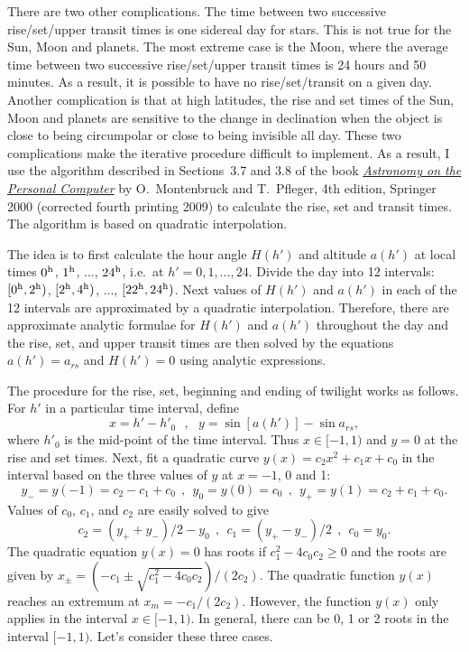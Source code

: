 \documentclass[12pt]{article}
\newcommand \beq {\begin{equation}}
\newcommand \eeq {\end{equation}}
\begin{document}
There are two other complications. The time between two successive 
rise/set/upper transit times is one sidereal day for stars. This is not true 
for the Sun, Moon and planets. The most extreme case is the Moon, where the 
average time between two successive rise/set/upper transit times is 24 hours 
and 50 minutes. As a result, it is possible to have no rise/set/transit on 
a given day. Another complication is that at high latitudes, the rise and set 
times of the Sun, Moon and planets are sensitive to the change in declination 
when the object is close to being circumpolar or close to being invisible all day. 
These two complications make the iterative procedure difficult to implement. As 
a result, I use the algorithm described in Sections~3.7 and 3.8 of the book 
\href{https://www.springer.com/us/book/9783540672210#}{\it Astronomy on the 
Personal Computer} by O.~Montenbruck and T.~Pfleger, 4th edition, Springer 2000 
(corrected fourth printing 2009) to calculate the rise, set and transit times. 
The algorithm is based on quadratic interpolation. 

The idea is to first calculate the hour angle $H(h')$ and altitude $a(h')$ at local times 
$0^{\rm h}$, $1^{\rm h}$, ..., $24^{\rm h}$, i.e.\ at 
$h'=0, 1, ..., 24$. Divide the day into 12 intervals: 
$[0^{\rm h}, 2^{\rm h})$, $[2^{\rm h}, 4^{\rm h})$, ..., $[22^{\rm h}, 24^{\rm h})$. 
Next values of $H(h')$ and $a(h')$ in each of the 12 intervals are approximated by 
a quadratic interpolation. Therefore, there are approximate analytic formulae for $H(h')$ and 
$a(h')$ throughout the day and the rise, set, 
and upper transit times are then solved by the equations $a(h')=a_{rs}$ and $H(h')=0$ 
using analytic expressions. 

The procedure for the rise, set, beginning and ending of twilight works as follows. 
For $h'$ in a particular time interval, define 
\beq
  x = h'-h'_0 \ \ \ , \ \ \ y = \sin [a(h')] - \sin a_{rs} ,
\eeq
where $h'_0$ is the mid-point of the time interval. Thus $x\in [-1,1)$ 
and $y=0$ at the rise and set times. 
Next, fit a quadratic curve $y(x)=c_2 x^2+c_1x+c_0$ in the interval 
based on the three values of $y$ at $x=-1$, 0 and 1: 
\beq
  y_- = y(-1)=c_2-c_1+c_0 \ \ , \ \ y_0=y(0)=c_0 \ \ , \ \ y_+=y(1)=c_2+c_1+c_0 .
\eeq
Values of $c_0$, $c_1$, and $c_2$ are easily solved to give 
\beq
  c_2 = (y_+ + y_-)/2 - y_0 \ \ , \ \ c_1 = (y_+ - y_-)/2  \ \ , \ \  c_0=y_0 .
\eeq
The quadratic equation $y(x)=0$ has roots if $c_1^2-4c_0c_2 \geq 0$ and the 
roots are given by $x_{\pm}=(-c_1\pm \sqrt{c_1^2-4c_0c_2})/(2c_2)$.
The quadratic function $y(x)$ 
reaches an extremum at $x_m=-c_1/(2c_2)$. However, the function $y(x)$ only applies 
in the interval $x\in [-1,1)$. In general, there can be 0, 1 or 2 roots in the interval 
$[-1,1)$. Let's consider these three cases. 
\end{document}
